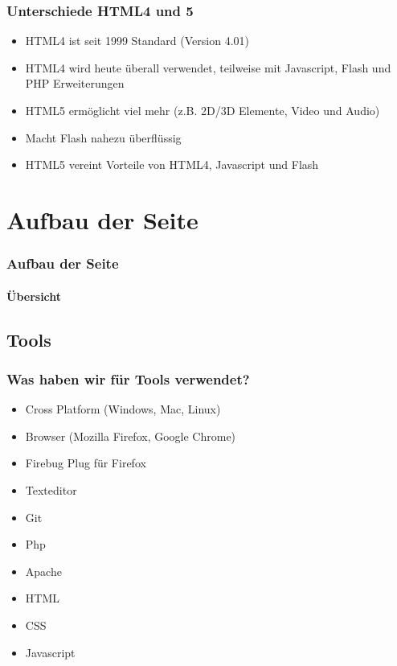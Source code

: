\documentclass[xcolor=dvipsnames]{beamer}
\begin{document}
\begin{frame} %
  \frametitle{Unterschiede HTML4 und 5} %
  \begin{block}{}
	\begin{itemize}
		\item HTML4 ist seit 1999 Standard (Version 4.01)
		\item HTML4 wird heute überall verwendet, teilweise mit Javascript, Flash und PHP Erweiterungen
		\item HTML5 ermöglicht viel mehr (z.B. 2D/3D Elemente, Video und Audio)
		\item Macht Flash nahezu überflüssig
		\item HTML5 vereint Vorteile von HTML4, Javascript und Flash
	\end{itemize}
  \end{block}
\end{frame}


\section{Aufbau der Seite}
\begin{frame} %
  \frametitle{Aufbau der Seite} %
  \framesubtitle{Übersicht} %
\end{frame}


\subsection{Tools}
\begin{frame} %
  \frametitle{Was haben wir für Tools verwendet?} %
  \begin{block}{}
	  \begin{itemize}
		\item Cross Platform (Windows, Mac, Linux)
		\item Browser (Mozilla Firefox, Google Chrome)  	
		\item Firebug Plug für Firefox
  		\item Texteditor
	  	\item Git
		\item Php
		\item Apache
		\item HTML
		\item CSS
		\item Javascript
	  \end{itemize}
  \end{block}
\end{frame}
\end{document}
